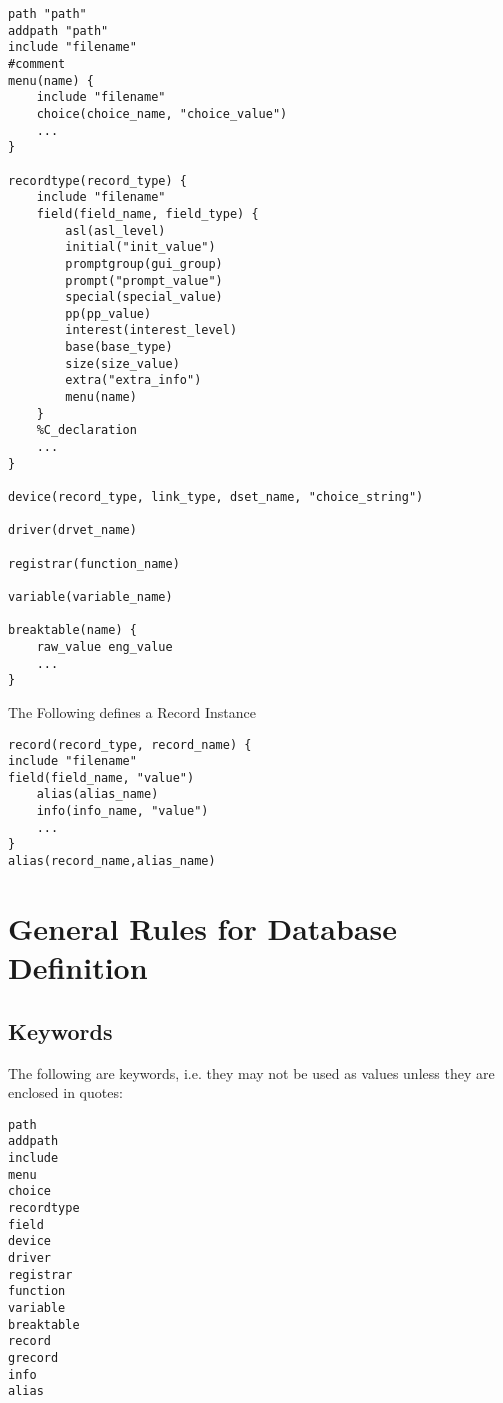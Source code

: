 \begin{verbatim}
path "path"
addpath "path"
include "filename"
#comment
menu(name) {
    include "filename"
    choice(choice_name, "choice_value")
    ...
}

recordtype(record_type) {
    include "filename"
    field(field_name, field_type) {
        asl(asl_level)
        initial("init_value")
        promptgroup(gui_group)
        prompt("prompt_value")
        special(special_value)
        pp(pp_value)
        interest(interest_level)
        base(base_type)
        size(size_value)
        extra("extra_info")
        menu(name)
    }
    %C_declaration
    ...
}

device(record_type, link_type, dset_name, "choice_string")

driver(drvet_name)

registrar(function_name)

variable(variable_name)

breaktable(name) {
    raw_value eng_value
    ...
}
\end{verbatim}

The Following defines a Record Instance

\begin{verbatim}
record(record_type, record_name) {
include "filename"
field(field_name, "value")
    alias(alias_name)
    info(info_name, "value")
    ...
}
alias(record_name,alias_name)
\end{verbatim}

\section{General Rules for Database Definition}

\subsection{Keywords}

The following are keywords, i.e. they may not be used as values unless they are enclosed in quotes:

\begin{verbatim}
path
addpath
include
menu
choice
recordtype
field
device
driver
registrar
function
variable
breaktable
record
grecord
info
alias
\end{verbatim}

